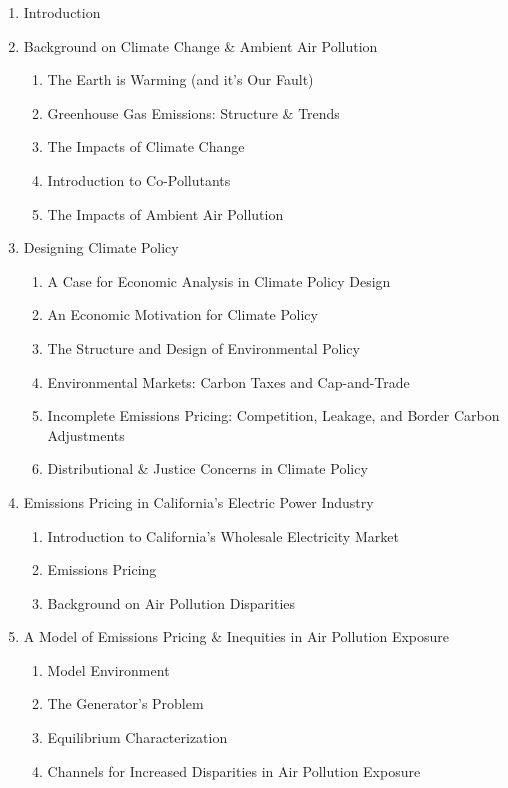 \documentclass[11pt]{article}
\begin{document}
\begin{enumerate}
	\item Introduction
	\item Background on Climate Change \& Ambient Air Pollution
	\begin{enumerate}
		\item The Earth is Warming (and it's Our Fault)
		\item Greenhouse Gas Emissions: Structure \& Trends
		\item The Impacts of Climate Change
		\item Introduction to Co-Pollutants
		\item The Impacts of Ambient Air Pollution
	\end{enumerate}
	\item Designing Climate Policy
	\begin{enumerate}
		\item A Case for Economic Analysis in Climate Policy Design
		\item An Economic Motivation for Climate Policy
		\item The Structure and Design of Environmental Policy
		\item Environmental Markets: Carbon Taxes and Cap-and-Trade
		\item Incomplete Emissions Pricing: Competition, Leakage, and Border Carbon Adjustments
		\item Distributional \& Justice Concerns in Climate Policy
	\end{enumerate}
	\item Emissions Pricing in California's Electric Power Industry
	\begin{enumerate}
		\item Introduction to California's Wholesale Electricity Market
		\item Emissions Pricing 
		\item Background on Air Pollution Disparities
	\end{enumerate}
	\item A Model of Emissions Pricing \& Inequities in Air Pollution Exposure
	\begin{enumerate}
		\item Model Environment
		\item The Generator's Problem
		\item Equilibrium Characterization
		\item Channels for Increased Disparities in Air Pollution Exposure
	\end{enumerate}

\end{enumerate}
\end{document}
